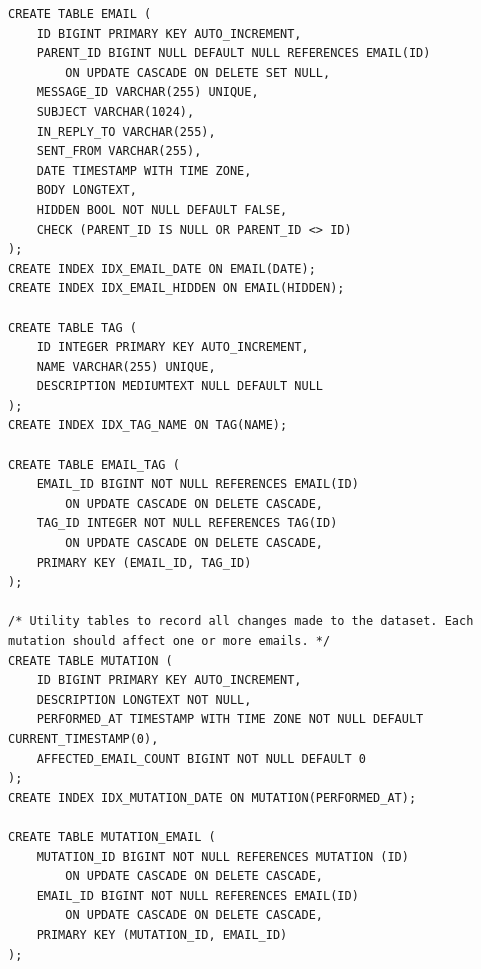 \documentclass[a4paper, 12pt]{article}
\begin{document}
		\begin{verbatim}
CREATE TABLE EMAIL (
	ID BIGINT PRIMARY KEY AUTO_INCREMENT,
	PARENT_ID BIGINT NULL DEFAULT NULL REFERENCES EMAIL(ID)
		ON UPDATE CASCADE ON DELETE SET NULL,
	MESSAGE_ID VARCHAR(255) UNIQUE,
	SUBJECT VARCHAR(1024),
	IN_REPLY_TO VARCHAR(255),
	SENT_FROM VARCHAR(255),
	DATE TIMESTAMP WITH TIME ZONE,
	BODY LONGTEXT,
	HIDDEN BOOL NOT NULL DEFAULT FALSE,
	CHECK (PARENT_ID IS NULL OR PARENT_ID <> ID)
);
CREATE INDEX IDX_EMAIL_DATE ON EMAIL(DATE);
CREATE INDEX IDX_EMAIL_HIDDEN ON EMAIL(HIDDEN);

CREATE TABLE TAG (
	ID INTEGER PRIMARY KEY AUTO_INCREMENT,
	NAME VARCHAR(255) UNIQUE,
	DESCRIPTION MEDIUMTEXT NULL DEFAULT NULL
);
CREATE INDEX IDX_TAG_NAME ON TAG(NAME);

CREATE TABLE EMAIL_TAG (
	EMAIL_ID BIGINT NOT NULL REFERENCES EMAIL(ID)
		ON UPDATE CASCADE ON DELETE CASCADE,
	TAG_ID INTEGER NOT NULL REFERENCES TAG(ID)
		ON UPDATE CASCADE ON DELETE CASCADE,
	PRIMARY KEY (EMAIL_ID, TAG_ID)
);

/* Utility tables to record all changes made to the dataset. Each mutation should affect one or more emails. */
CREATE TABLE MUTATION (
	ID BIGINT PRIMARY KEY AUTO_INCREMENT,
	DESCRIPTION LONGTEXT NOT NULL,
	PERFORMED_AT TIMESTAMP WITH TIME ZONE NOT NULL DEFAULT CURRENT_TIMESTAMP(0),
	AFFECTED_EMAIL_COUNT BIGINT NOT NULL DEFAULT 0
);
CREATE INDEX IDX_MUTATION_DATE ON MUTATION(PERFORMED_AT);

CREATE TABLE MUTATION_EMAIL (
	MUTATION_ID BIGINT NOT NULL REFERENCES MUTATION (ID)
		ON UPDATE CASCADE ON DELETE CASCADE,
	EMAIL_ID BIGINT NOT NULL REFERENCES EMAIL(ID)
		ON UPDATE CASCADE ON DELETE CASCADE,
	PRIMARY KEY (MUTATION_ID, EMAIL_ID)
);
		\end{verbatim}
\end{document}

